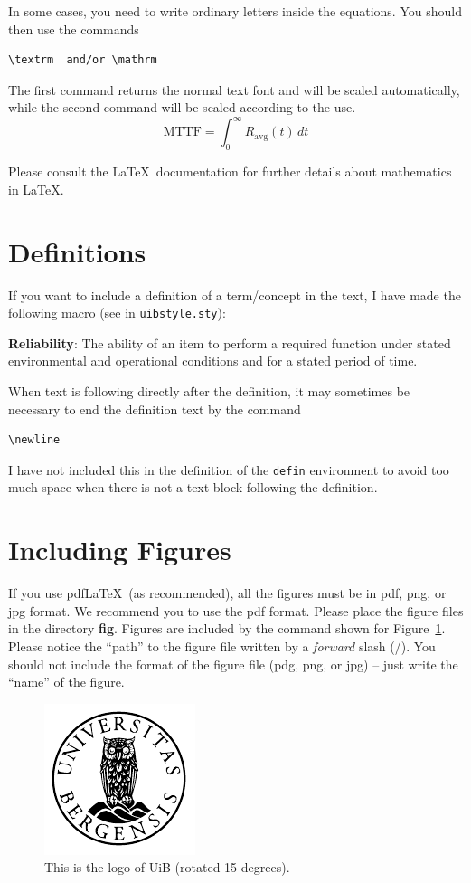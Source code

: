 \documentclass[../Main/thesis.tex]{subfiles}
\begin{document}
In some cases, you need to write ordinary letters inside the equations. 
You should then use the commands 
\begin{verbatim}
\textrm  and/or \mathrm
\end{verbatim}
The first command returns the normal text font and will be scaled automatically, while the second command will be scaled according to the use.
\begin{equation*}
\textrm{MTTF}= \int_0^\infty R_\mathrm{avg}(t)\,dt
\end{equation*}



Please consult the \LaTeX\ documentation for further details about mathematics in \LaTeX.
\section*{Definitions}
\label{sec:definitions}
If you want to include a definition of a term/concept in the text, I have made the following macro (see in \texttt{uibstyle.sty}):
\begin{defin}
\textbf{Reliability}: The ability of an item to perform a required function under stated environmental and operational conditions and for a stated period of time.\newline
\end{defin}
When text is following directly after the definition, it may sometimes be necessary to end the definition text by the command
\begin{verbatim}
\newline
\end{verbatim}
I have not included this in the definition of the \texttt{defin} environment to avoid too much space when there is not a text-block following the definition.
\section{Including Figures}
\label{sec:including_figures}
If you use pdf\LaTeX\ (as recommended), all the figures must be in pdf, png, or jpg format. 
We recommend you to use the pdf format.  
Please place the figure files in the directory \textbf{fig}. 
Figures are included by the command shown for Figure~\ref{fig:uib_logo_rotated}. 
Please notice the ``path'' to the figure file written by a \emph{forward} slash (/). 
You should not include the format of the figure file (pdg, png, or jpg) -- just write the ``name'' of the figure. 
\begin{figure}
\centering
\includegraphics[scale=0.6,angle=15]{../Figures/uib}
\caption{This is the logo of UiB (rotated 15 degrees).}
\label{fig:uib_logo_rotated}
\end{figure}
\end{document}
